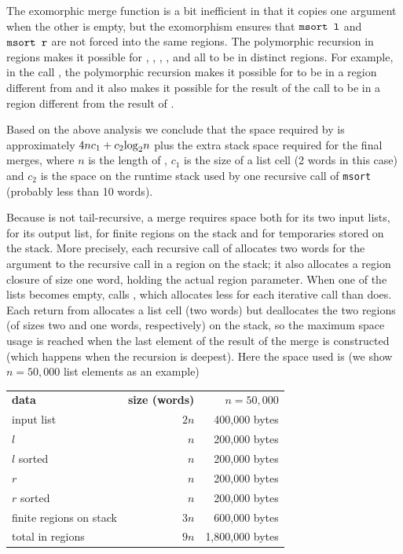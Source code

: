 \documentclass[12pt]{book}
\begin{document}
The exomorphic merge function is a bit inefficient in that it copies
one argument when the other is empty, but the exomorphism ensures that
$\hbox{\tt msort l}$ and $\hbox{\tt msort r}$ are not forced into the same
regions. The polymorphic recursion in regions makes it possible for
, , , , and 
all to be in distinct regions. For example, in the call , the polymorphic recursion makes it possible for  to be
in a region different from  and it also makes it possible for
the result of the call to be in a region different from the result of
.

Based on the above analysis we conclude that the space required by
 is approximately $4nc_1+c_2{\rm log}_2n$ plus the extra
stack space required for the final merges, where $n$ is 
the length of , $c_1$ is the size of a list cell (2 words in this
case) and $c_2$ is the space on the runtime stack used by one recursive call
of {\tt msort} (probably less than 10 words). 

Because  is not tail-recursive, 
a merge requires space both for
its two input lists, for its output list, 
for finite regions on the stack and for
temporaries stored on the stack.  More precisely,
each recursive call of  allocates two words
for the argument to the recursive call in a region on the stack;
it also allocates a region closure of size one word, holding
the actual region parameter. When one of the lists becomes empty,
 calls , which allocates less for each 
iterative call than  does. Each return from 
 allocates a list cell (two words) but deallocates
the two regions (of sizes two and one words, respectively) 
on the stack, so
the maximum space usage is reached when the last element of the
result of the merge is constructed (which happens when the recursion 
is deepest). Here the space used is (we show $n = 50,000$ list elements
as an example)
\begin{center}
\begin{tabular}{lrr}
{\bf data} & {\bf size (words)} &$n=50,000$\\
input list& $2n$ & 400,000 bytes\\
$l$ & $n$ & 200,000 bytes\\
$l$ sorted & $n$ & 200,000 bytes\\
$r$ & $n$ & 200,000 bytes\\
$r$ sorted & $n$ & 200,000 bytes\\
finite regions on stack & $3n$ & 600,000 bytes\\ \hline
total in regions& $9n$ & 1,800,000 bytes
\end{tabular}
\end{center}
\end{document}

